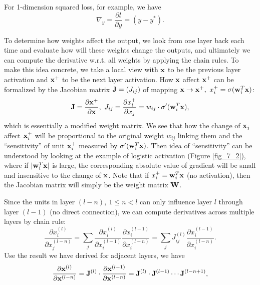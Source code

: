 \documentclass[../book-template.tex]{subfiles}
\begin{document}
For 1-dimension squared loss, for example, we have
\begin{equation*}
	\nabla_{y}=\frac{\partial l}{\partial y}=(y-y^*).
\end{equation*}
\par To determine how weights affect the output, we look from one layer back each time and evaluate how will these weights change the outputs, and ultimately we can compute the derivative w.r.t. all weights by applying the chain rules. To make this idea concrete, we take a local view with ${\bf x}$ to be the previous layer activation and ${\bf x}^+$ to be the next layer activation. How ${\bf x}$ affect ${\bf x}^+$ can be formalized by the Jacobian matrix ${\bf J}=(J_{ij})$ of mapping ${\bf x}\rightarrow{\bf x}^+,\ {x}^+_i = \sigma({\bf w}_i^T{\bf x})$:
\begin{equation*}
	{\bf J}=\frac{\partial {\bf x}^+}{\partial {\bf x}},\ J_{ij}=\frac{\partial x_i^+}{\partial x_j}=w_{ij}\cdot \sigma'({\bf w}_i^T{\bf x}),
\end{equation*}
which is essentially a modified weight matrix. We see that how the change of ${\bf x}_j$ affect ${\bf x}^+_i$ will be proportional to the original weight $w_{ij}$ linking them and the ``sensitivity'' of unit ${\bf x}^+_i$ measured by $\sigma'({\bf w}_i^T{\bf x})$. Then idea of ``sensitivity'' can be understood by looking at the example of logistic activation (Figure \ref{fig_7_2}), where if $|{\bf w}_i^T{\bf x}|$ is large, the corresponding absolute value of gradient will be small and insensitive to the change of ${\bf x}$. Note that if ${x}^+_i = {\bf w}_i^T{\bf x}$ (no activation), then the Jacobian matrix will simply be the weight matrix ${\bf W}$.
\par Since the units in layer $(l-n),\ 1\leq n<l$ can only influence layer $l$ through layer $(l-1)$ (no direct connection), we can compute derivatives across multiple layers by chain rule:
\begin{equation*}
	\frac{\partial x_i^{(l)}}{\partial x_j^{(l-n)}} = \sum_{j}\frac{\partial x_i^{(l)}}{\partial x_i^{(l-1)}} \frac{\partial x_i^{(l-1)}}{\partial x_i^{(l-n)}} =  \sum_{j} J_{ij}^{(l)} \frac{\partial x_i^{(l-1)}}{\partial x_i^{(l-n)}}.
\end{equation*} 
Use the result we have derived for adjacent layers, we have
\begin{equation*}
	\frac{\partial {\bf x}^{(l)}}{\partial {\bf x}^{(l-n)}} = {\bf J}^{(l)}\cdot \frac{\partial {\bf x}^{(l-1)}}{\partial {\bf x}^{(l-n)}}={\bf J}^{(l)}\cdot {\bf J}^{(l-1)}\cdots {\bf J}^{(l-n+1)},
\end{equation*}
\end{document}
